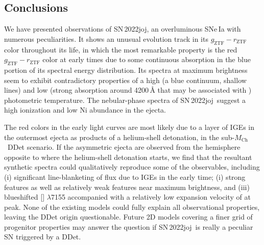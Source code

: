 \documentclass[twocolumn]{aastex631}
\newcommand{\sn}{SN\,2022joj}
\newcommand{\Mch}{$M_\mathrm{Ch}$}
\begin{document}
\begin{CJK*}{UTF8}{gbsn}
\section{Conclusions} \label{sec:conclusion}
We have presented observations of \sn, an overluminous SNe\,Ia with numerous peculiarities. It shows an unusual evolution track in its $g_\mathrm{ZTF}-r_\mathrm{ZTF}$ color throughout its life, in which the most remarkable property is the red $g_\mathrm{ZTF}-r_\mathrm{ZTF}$ color at early times due to some continuous absorption in the blue portion of its spectral energy distribution. Its spectra at maximum brightness seem to exhibit contradictory properties of a high (a blue continuum, shallow  lines) and low (strong absorption around 4200\,\r{A} that may be associated with ) photometric temperature. The nebular-phase spectra of \sn\ suggest a high ionization and low Ni abundance in the ejecta.

The red colors in the early light curves are most likely due to a layer of IGEs in the outermost ejecta as products of a helium-shell detonation, in the sub-\Mch\ DDet scenario. If the asymmetric ejecta are observed from the hemisphere opposite to where the helium-shell detonation starts, we find that the resultant synthetic spectra could qualitatively reproduce some of the observables, including (i) significant line-blanketing of flux due to IGEs in the early time; (i) strong  features as well as relatively weak  features near maximum brightness, and (iii) blueshifted [] $\lambda$7155 accompanied with a relatively low expansion velocity of  at peak. None of the existing models could fully explain all observational properties, leaving the DDet origin questionable. Future 2D models covering a finer grid of progenitor properties may answer the question if \sn\ is really a peculiar SN triggered by a DDet.\\



\end{CJK*}
\end{document}
